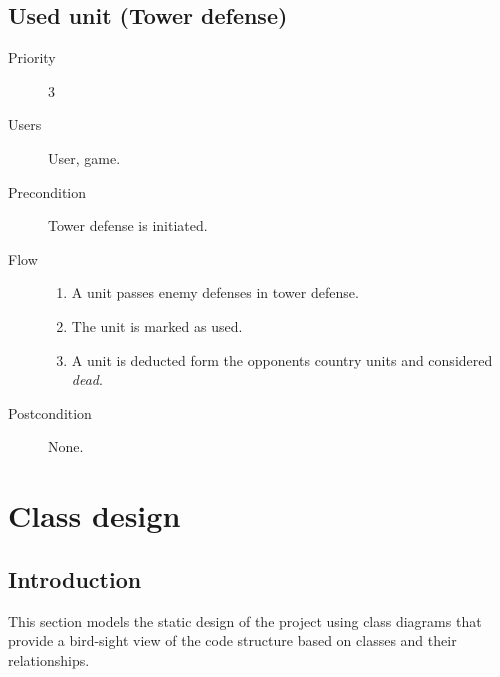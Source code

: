 \documentclass[12pt,a4paper]{article}
\let\stdsection\section
\renewcommand\section{\newpage\stdsection}
\begin{document}
\subsection{Used unit (Tower defense)}
\begin{description}
\item[Priority] 3
\item[Users] User, game.
\item[Precondition] Tower defense is initiated.
\item[Flow]\mbox{}
  \begin{enumerate}
  \item A unit passes enemy defenses in tower defense.
  \item The unit is marked as used.
  \item A unit is deducted form the opponents country units and
    considered \emph{dead}.
  \end{enumerate}
\item[Postcondition] None.
\end{description}


\onecolumn


\section{Class design}

\subsection{Introduction}
This section models the static design of the project using class
diagrams that provide a bird-sight view of the code structure based on
classes and their relationships.
\end{document}
